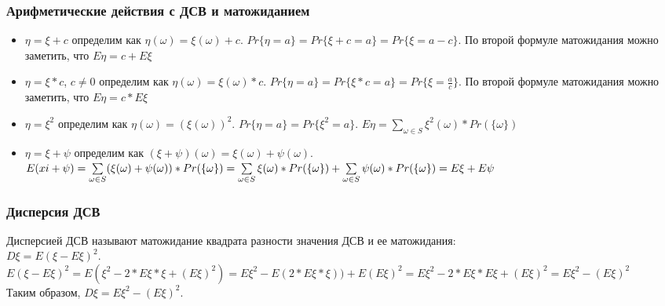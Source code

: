 \subsubsection{Арифметические действия с ДСВ и матожиданием}
\begin{itemize}
\item $\eta = \xi + c$ определим как $\eta(\omega) = \xi(\omega) + c$. $Pr\{\eta = a\} = Pr\{\xi + c = a\} = Pr\{\xi = a - c\}$. По второй формуле матожидания можно заметить, что $E \eta = c + E \xi$\\
\item $\eta = \xi * c$, $c \not= 0$ определим как $\eta(\omega) = \xi(\omega) * c$. $Pr\{\eta = a\} = Pr\{\xi * c = a\} = Pr\{\xi = \frac{a}{c}\}$. По второй формуле матожидания можно заметить, что $E \eta = c * E \xi$\\
\item $\eta = \xi^2$ определим как $\eta(\omega) = (\xi(\omega))^2$. $Pr\{\eta = a\} = Pr\{\xi^2 = a\}$. $E \eta = \sum\limits_{\omega \in S}\xi^2(\omega) * Pr(\{\omega\})$\\
\item $\eta = \xi + \psi$ определим как $(\xi + \psi)(\omega) = \xi(\omega) + \psi(\omega)$. $E (\\xi + \psi) = \sum\limits_{\omega \in S} (\xi(\omega) + \psi(\omega)) * Pr(\{\omega\}) = \sum\limits_{\omega \in S} \xi(\omega) * Pr(\{\omega\}) + \sum\limits_{\omega \in S} \psi(\omega) * Pr(\{\omega\}) = E \xi + E \psi$
\end{itemize}
\subsubsection{Дисперсия ДСВ}
Дисперсией ДСВ называют матожидание квадрата разности значения ДСВ и ее матожидания:\\
$D \xi = E (\xi - E \xi)^2$.\\
$E (\xi - E \xi)^2 = E (\xi^2 - 2 * E \xi * \xi + (E \xi)^2) = E \xi^2 - E (2 * E \xi * \xi)) + E (E \xi)^2 = E \xi^2 - 2 * E \xi * E \xi + (E \xi)^2 = E \xi^2 - (E \xi)^2$\\
Таким образом, $D \xi = E \xi^2 - (E \xi)^2$.